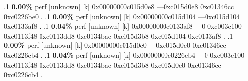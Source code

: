 \begin{profile}
{.1 \textbf{ 0.00\%} perf             [unknown]              [k] 0x00000000c015d0e8\newline {} ---0xc015d0e8\newline {} 0xc01346cc\newline {} 0xc0226be0\newline {} . 
.1 \textbf{ 0.00\%} perf             [unknown]              [k] 0x00000000c015d104\newline {} ---0xc015d104\newline {} 0xc0133af8\newline {} . 
.1 \textbf{ 0.04\%} perf             [unknown]              [k] 0x00000000c0133af8\newline {} ---0\newline {} 0xc003c100\newline {} 0xc0113f48\newline {} 0xc0113dd8\newline {} 0xc0134bac\newline {} 0xc015d3b8\newline {} 0xc015d104\newline {} 0xc0133af8\newline {} . 
.1 \textbf{ 0.00\%} perf             [unknown]              [k] 0x00000000c015d0c0\newline {} ---0xc015d0c0\newline {} 0xc01346cc\newline {} 0xc0226cb4\newline {} . 
.1 \textbf{ 0.04\%} perf             [unknown]              [k] 0x00000000c0226cb4\newline {} ---0\newline {} 0xc003c100\newline {} 0xc0113f48\newline {} 0xc0113dd8\newline {} 0xc0134bac\newline {} 0xc015d3b8\newline {} 0xc015d0c0\newline {} 0xc01346cc\newline {} 0xc0226cb4\newline {} . 
}
\end{profile}
